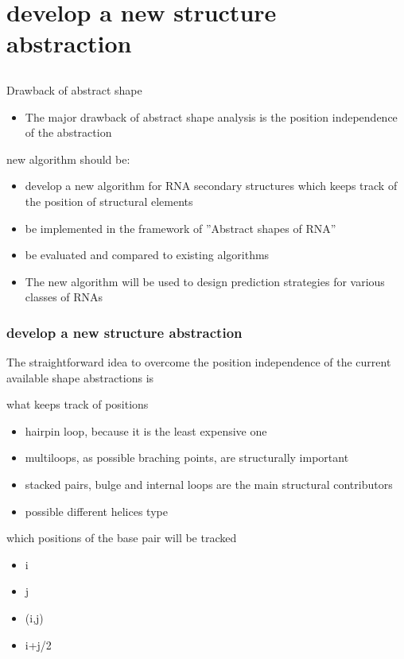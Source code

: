 \documentclass[ignorenonframetext,10pt]{beamer}
\begin{document}
\section{develop a new structure abstraction}
\subsection{}
\begin{frame}
\frametitle{}
   \begin{block}{\small Drawback of abstract shape}
   \begin{itemize} 
   \item The major drawback of abstract shape analysis is the position
   independence of the abstraction
   \end{itemize}
   \end{block}
   \begin{block}{\small new algorithm should be:}
   \begin{itemize}
     \item develop a new algorithm for RNA secondary structures which keeps
     track of the position of structural elements
     \item be implemented in the framework of ''Abstract shapes of RNA''
     \item be evaluated and compared to existing algorithms
     \item The new algorithm will be used to design prediction strategies for
     various classes of RNAs
   \end{itemize} 
   \end{block}
\end{frame}


\begin{frame}
\frametitle{develop a new structure abstraction}
    The straightforward idea to overcome the position independence of the
    current available shape abstractions is
    \begin{block}{what keeps track of positions}
    \begin{itemize} 
    \item hairpin loop, because it is the least expensive one
    \item multiloops, as possible braching points, are structurally important    
    \item stacked pairs, bulge and internal loops are the main structural
    contributors 
    \item possible different helices type
    \end{itemize}
    \end{block}
    \begin{block}{which positions of the base pair will be tracked}
    \begin{itemize} 
    \item i
    \item j   
    \item (i,j)
    \item i+j/2
    \end{itemize}    
    \end{block}
\end{frame}
\end{document}
